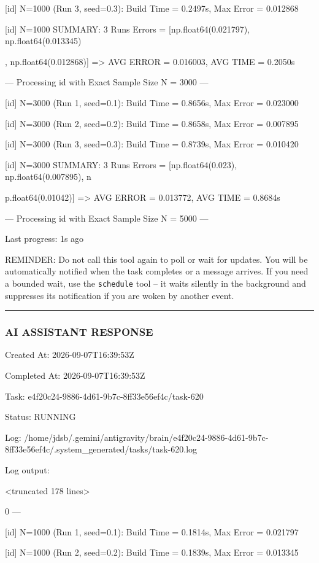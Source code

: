 \documentclass[11pt,a4paper]{article}
\begin{document}
[id] N=1000 (Run 3, seed=0.3): Build Time = 0.2497s, Max Error = 0.012868

[id] N=1000 SUMMARY: 3 Runs Errors = [np.float64(0.021797), np.float64(0.013345)

, np.float64(0.012868)] => AVG ERROR = 0.016003, AVG TIME = 0.2050s

--- Processing id with Exact Sample Size N = 3000 ---

[id] N=3000 (Run 1, seed=0.1): Build Time = 0.8656s, Max Error = 0.023000

[id] N=3000 (Run 2, seed=0.2): Build Time = 0.8658s, Max Error = 0.007895

[id] N=3000 (Run 3, seed=0.3): Build Time = 0.8739s, Max Error = 0.010420

[id] N=3000 SUMMARY: 3 Runs Errors = [np.float64(0.023), np.float64(0.007895), n

p.float64(0.01042)] => AVG ERROR = 0.013772, AVG TIME = 0.8684s

--- Processing id with Exact Sample Size N = 5000 ---


Last progress: 1s ago



REMINDER: Do not call this tool again to poll or wait for updates. You will be automatically notified when the task completes or a message arrives. If you need a bounded wait, use the \texttt{schedule} tool -- it waits silently in the background and suppresses its notification if you are woken by another event.


\hrule

\subsubsection{AI ASSISTANT RESPONSE}

Created At: 2026-09-07T16:39:53Z

Completed At: 2026-09-07T16:39:53Z

Task: e4f20c24-9886-4d61-9b7c-8ff33e56ef4c/task-620

Status: RUNNING

Log: /home/jdsb/.gemini/antigravity/brain/e4f20c24-9886-4d61-9b7c-8ff33e56ef4c/.system\_generated/tasks/task-620.log

Log output:

<truncated 178 lines>

0 ---

[id] N=1000 (Run 1, seed=0.1): Build Time = 0.1814s, Max Error = 0.021797

[id] N=1000 (Run 2, seed=0.2): Build Time = 0.1839s, Max Error = 0.013345
\end{document}
